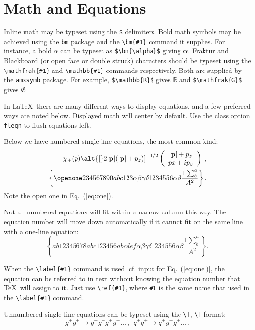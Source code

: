 \documentclass[%
 aip,
 amsmath,amssymb,
 reprint,%
]{revtex4-2}
\begin{document}
\section{Math and Equations}
Inline math may be typeset using the \verb+$+ delimiters. Bold math
symbols may be achieved using the \verb+bm+ package and the
\verb+\bm{#1}+ command it supplies. For instance, a bold $\alpha$ can
be typeset as \verb+$\bm{\alpha}$+ giving $\bm{\alpha}$. Fraktur and
Blackboard (or open face or double struck) characters should be
typeset using the \verb+\mathfrak{#1}+ and \verb+\mathbb{#1}+ commands
respectively. Both are supplied by the \texttt{amssymb} package. For
example, \verb+$\mathbb{R}$+ gives $\mathbb{R}$ and
\verb+$\mathfrak{G}$+ gives $\mathfrak{G}$

In \LaTeX\ there are many different ways to display equations, and a
few preferred ways are noted below. Displayed math will center by
default. Use the class option \verb+fleqn+ to flush equations left.

Below we have numbered single-line equations, the most common kind: 
\begin{eqnarray}
\chi_+(p)\alt{\bf [}2|{\bf p}|(|{\bf p}|+p_z){\bf ]}^{-1/2}
\left(
\begin{array}{c}
|{\bf p}|+p_z\\
px+ip_y
\end{array}\right)\;,
\\
\left\{%
 \openone234567890abc123\alpha\beta\gamma\delta1234556\alpha\beta
 \frac{1\sum^{a}_{b}}{A^2}%
\right\}%
\label{eq:one}.
\end{eqnarray}
Note the open one in Eq.~(\ref{eq:one}).

Not all numbered equations will fit within a narrow column this
way. The equation number will move down automatically if it cannot fit
on the same line with a one-line equation:
\begin{equation}
\left\{
 ab12345678abc123456abcdef\alpha\beta\gamma\delta1234556\alpha\beta
 \frac{1\sum^{a}_{b}}{A^2}%
\right\}.
\end{equation}

When the \verb+\label{#1}+ command is used [cf. input for
Eq.~(\ref{eq:one})], the equation can be referred to in text without
knowing the equation number that \TeX\ will assign to it. Just
use \verb+\ref{#1}+, where \verb+#1+ is the same name that used in
the \verb+\label{#1}+ command.

Unnumbered single-line equations can be typeset
using the \verb+\[+, \verb+\]+ format:
\[g^+g^+ \rightarrow g^+g^+g^+g^+ \dots ~,~~q^+q^+\rightarrow
q^+g^+g^+ \dots ~. \]
\end{document}

